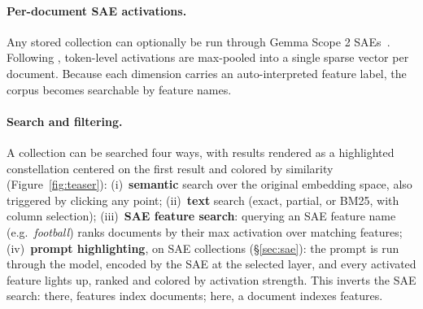 \documentclass[11pt]{article}
\begin{document}









\paragraph{Per-document SAE activations.}
Any stored collection can optionally be run through Gemma Scope 2 SAEs~\cite{mcdougall2025gemmascope2}. Following \citet{jiang2025interpretableembeddingssparseautoencoders}, token-level activations are max-pooled into a single sparse vector per document. Because each dimension carries an auto-interpreted feature label, the corpus becomes searchable by feature names. 

\paragraph{Search and filtering.}
A collection can be searched four ways, with results rendered as a highlighted constellation centered on the first result and colored by similarity (Figure~\ref{fig:teaser}): (i)~\textbf{semantic} search over the original embedding space, also triggered by clicking any point; (ii)~\textbf{text} search (exact, partial, or BM25, with column selection); (iii)~\textbf{SAE feature search}: querying an SAE feature name (e.g.\ \emph{football}) ranks documents by their max activation over matching features; (iv)~\textbf{prompt highlighting}, on SAE collections (\S\ref{sec:sae}): the prompt is run through the model, encoded by the SAE at the selected layer, and every activated feature lights up, ranked and colored by activation strength. This inverts the SAE search: there, features index documents; here, a document indexes features.




\end{document}
